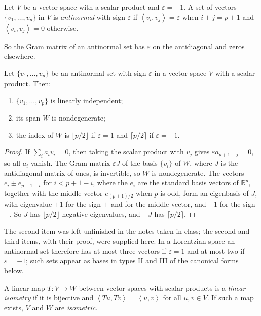 \begin{definition}
\label{definition-palmas-antinormal}
Let $V$ be a vector space with a scalar
product and $\varepsilon=\pm 1$. A set of
vectors $\{v_1,\dots,v_p\}$ in $V$ is
\emph{antinormal} with sign $\varepsilon$
if
$\left\langle{} v_i,v_j \right\rangle{}
=\varepsilon$ when $i+j=p+1$ and
$\left\langle{} v_i,v_j \right\rangle{}=0$
otherwise.
\end{definition}

So the Gram matrix of an antinormal set
has $\varepsilon$ on the antidiagonal and
zeros elsewhere.

\begin{theorem}
\label{theorem-palmas-antinormal}
Let $\{v_1,\dots,v_p\}$ be an antinormal
set with sign $\varepsilon$ in a vector
space $V$ with a scalar product. Then:
\begin{enumerate}
\item $\{v_1,\dots,v_p\}$ is linearly
independent;
\item its span $W$ is nondegenerate;
\item the index of $W$ is
$\lfloor p/2\rfloor$ if $\varepsilon=1$
and $\lceil p/2\rceil$ if
$\varepsilon=-1$.
\end{enumerate}
\end{theorem}

\begin{proof}
If $\sum_i a_iv_i=0$, then taking the
scalar product with $v_j$ gives
$\varepsilon a_{p+1-j}=0$, so all $a_i$
vanish. The Gram matrix $\varepsilon J$ of
the basis $\{v_i\}$ of $W$, where $J$ is
the antidiagonal matrix of ones, is
invertible, so $W$ is nondegenerate. The
vectors $e_i\pm e_{p+1-i}$ for
$i<p+1-i$, where the $e_i$ are the standard
basis vectors of $\mathbb{R}^p$, together
with the middle vector
$e_{(p+1)/2}$ when $p$ is odd, form an
eigenbasis of $J$, with eigenvalue $+1$
for the sign $+$ and for the middle
vector, and $-1$ for the sign $-$. So $J$
has $\lfloor p/2\rfloor$ negative
eigenvalues, and $-J$ has
$\lceil p/2\rceil$.
\end{proof}

The second item was left unfinished in the
notes taken in class; the second and third
items, with their proof, were supplied
here. In a Lorentzian space an antinormal
set therefore has at most three vectors if
$\varepsilon=1$ and at most two if
$\varepsilon=-1$; such sets appear as bases
in types II and III of the canonical forms
below.

\begin{definition}
\label{definition-palmas-linear-isometry}
A linear map $T\colon V\to W$ between
vector spaces with scalar products is a
\emph{linear isometry} if it is bijective
and
$\left\langle{} Tu,Tv \right\rangle{}
=\left\langle{} u,v \right\rangle{}$
for all $u,v\in V$. If such a map exists,
$V$ and $W$ are \emph{isometric}.
\end{definition}

